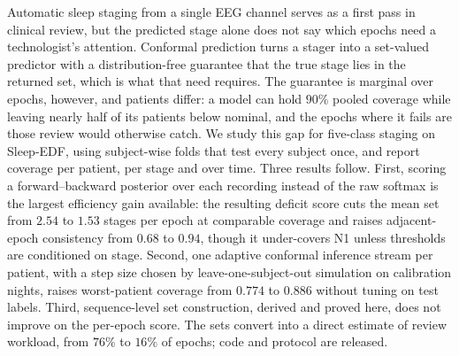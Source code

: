 Automatic sleep staging from a single EEG channel serves as a first pass in
clinical review, but the predicted stage alone does not say which epochs need
a technologist's attention. Conformal prediction turns a stager into a
set-valued predictor with a distribution-free guarantee that the true stage
lies in the returned set, which is what that need requires.
The guarantee is marginal over epochs, however, and patients differ: a model
can hold $90\%$ pooled coverage while leaving nearly half of its patients
below nominal, and the epochs where it fails are those review would otherwise
catch. We study this gap for five-class staging on Sleep-EDF, using
subject-wise folds that test every subject once, and report coverage per
patient, per stage and over time. Three results follow. First,
scoring a forward--backward posterior over each recording instead of the raw
softmax is the largest efficiency gain available: the resulting deficit score
cuts the mean set from $2.54$ to $1.53$ stages per epoch at comparable
coverage and raises adjacent-epoch consistency from $0.68$ to $0.94$, though
it under-covers N1 unless thresholds are conditioned on stage. Second, one
adaptive conformal inference stream per patient, with a step size chosen by
leave-one-subject-out simulation on calibration nights, raises worst-patient
coverage from $0.774$ to $0.886$ without tuning on test labels. Third,
sequence-level set construction, derived and proved here, does not improve on
the per-epoch score. The sets convert into a direct estimate of review
workload, from $76\%$ to $16\%$ of epochs; code and protocol are released.
